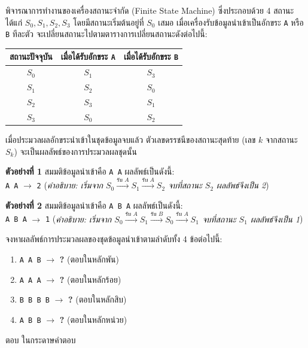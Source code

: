 \question 
พิจารณาการทำงานของเครื่องสถานะจำกัด (Finite State Machine) ซึ่งประกอบด้วย 4 สถานะ ได้แก่ $S_0, S_1, S_2, S_3$ โดยมีสถานะเริ่มต้นอยู่ที่ $S_0$ เสมอ เมื่อเครื่องรับข้อมูลนำเข้าเป็นอักขระ \texttt{A} หรือ \texttt{B} ทีละตัว จะเปลี่ยนสถานะไปตามตารางการเปลี่ยนสถานะดังต่อไปนี้:

\begin{center}
\begin{tabular}{|c|c|c|}
\hline
\textbf{สถานะปัจจุบัน} & \textbf{เมื่อได้รับอักขระ \texttt{A}} & \textbf{เมื่อได้รับอักขระ \texttt{B}} \\ \hline
$S_0$ & $S_1$ & $S_3$ \\ \hline
$S_1$ & $S_2$ & $S_0$ \\ \hline
$S_2$ & $S_3$ & $S_1$ \\ \hline
$S_3$ & $S_0$ & $S_2$ \\ \hline
\end{tabular}
\end{center}

เมื่อประมวลผลอักขระนำเข้าในชุดข้อมูลจบแล้ว ตัวเลขดรรชนีของสถานะสุดท้าย (เลข $k$ จากสถานะ $S_k$) จะเป็นผลลัพธ์ของการประมวลผลชุดนั้น

\medskip
\textbf{ตัวอย่างที่ 1} สมมติข้อมูลนำเข้าคือ \texttt{A A} ผลลัพธ์เป็นดังนี้:\\
\texttt{A A} $\rightarrow$ \texttt{2} \quad (\textit{คำอธิบาย: เริ่มจาก $S_0 \xrightarrow{\text{รับ } A} S_1 \xrightarrow{\text{รับ } A} S_2$ จบที่สถานะ $S_2$ ผลลัพธ์จึงเป็น 2})

\medskip
\textbf{ตัวอย่างที่ 2} สมมติข้อมูลนำเข้าคือ \texttt{A B A} ผลลัพธ์เป็นดังนี้:\\
\texttt{A B A} $\rightarrow$ \texttt{1} \quad (\textit{คำอธิบาย: เริ่มจาก $S_0 \xrightarrow{\text{รับ } A} S_1 \xrightarrow{\text{รับ } B} S_0 \xrightarrow{\text{รับ } A} S_1$ จบที่สถานะ $S_1$ ผลลัพธ์จึงเป็น 1})

\medskip
จงหาผลลัพธ์การประมวลผลของชุดข้อมูลนำเข้าตามลำดับทั้ง 4 ข้อต่อไปนี้:
\begin{enumerate}
    \item \texttt{A A B} $\rightarrow$ \textbf{?} (ตอบในหลักพัน)
    \item \texttt{A A A} $\rightarrow$ \textbf{?} (ตอบในหลักร้อย)
    \item \texttt{B B B B} $\rightarrow$ \textbf{?} (ตอบในหลักสิบ)
    \item \texttt{A B B} $\rightarrow$ \textbf{?} (ตอบในหลักหน่วย)
\end{enumerate}

\par\medskip
ตอบ ในกระดาษคำตอบ 

